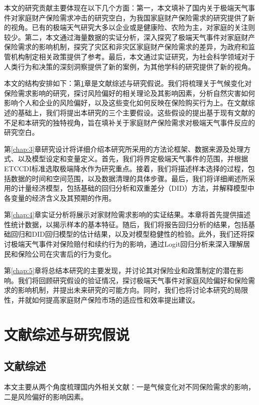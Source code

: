 本文的研究贡献主要体现在以下几个方面：第一，本文填补了国内关于极端天气事件对家庭财产保险需求冲击的研究空白，为我国家庭财产保险需求的研究提供了新的视角。已有的极端天气研究大多以企业\citep{0Do}或是健康险\citep{赵强2021空气污染对商业健康保险需求的影响}、农险\citep{胡新艳2021气候变化}为主，对家庭的关注则较少。第二，本文通过海量数据的实证分析，深入探究了极端天气事件对家庭财产保险需求的影响机制，探究了灾区和非灾区家庭财产保险需求的差异，为政府和监管机构制定相关政策提供了参考。最后，本文通过实证研究，为社会科学领域对于人类行为和决策的深刻洞察提供了新的案例，为其他学科的研究提供了新的视角。

本文的结构安排如下：第\ref{chap:2}章是文献综述与研究假说。我们将梳理关于气候变化对保险需求影响的研究，探讨风险偏好的相关理论及其影响因素，分析自然灾害如何影响个人和企业的风险偏好，以及这些变化如何反映在保险购买行为上。在文献综述的基础上，我们将提出本研究的三个主要假设。这些假设的提出基于现有文献的不足和本研究的独特视角，旨在填补关于家庭财产保险需求对极端天气事件反应的研究空白。

第\ref{chap:3}章研究设计将详细介绍本研究所采用的方法论框架、数据来源及处理方式、以及模型设定和变量定义。首先，我们将界定极端天气事件的范围，并根据ETCCDI标准选取极端降水作为研究重点。接着，我们将描述样本选择的过程，包括数据的时间和空间范围，以及数据清理的具体步骤。最后，我们将详细阐述所采用的计量经济模型，包括基础的回归分析和双重差分（DID）方法，并解释模型中各变量的经济含义及其预期的作用。

第\ref{chap:4}章实证分析将展示对家财险需求影响的实证结果。本章将首先提供描述性统计数据，以揭示样本的基本特征。随后，我们将报告回归分析的结果，包括基础回归和DID回归模型的估计结果，以及对模型稳健性的检验。此外，我们还将探讨极端天气事件对保险赔付和续约行为的影响，通过Logit回归分析来深入理解居民和保险公司在灾害后的行为变化。

第\ref{chap:5}章将总结本研究的主要发现，并讨论其对保险业和政策制定的潜在影响。我们将回顾研究假设的验证情况，探讨极端天气事件对家庭风险偏好和保险需求的影响机制，并提出未来研究的可能方向。同时，我们也将讨论本研究的局限性，并就如何提高家庭财产保险市场的适应性和效率提出建议。

\chapter{文献综述与研究假说}\label{chap:2}
\section{文献综述}

本文主要从两个角度梳理国内外相关文献：一是气候变化对不同保险需求的影响，二是风险偏好的影响因素。

